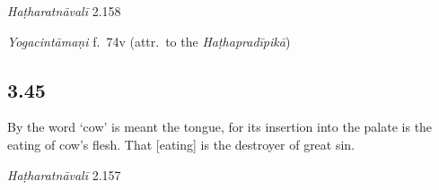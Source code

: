 \begin{ekdosis}

\begin{testimonia}[hp03_044]
\emph{Haṭharatnāvalī} 2.158
\begin{versinnote}
\end{versinnote}

\emph{Yogacintāmaṇi} f.~74v (attr.~to the \emph{Haṭhapradīpikā})
\begin{versinnote}
\end{versinnote}


\end{testimonia}


\subsection*{3.45}
\begin{translation}[hp03_045]
By the word `cow' is meant the tongue, for its insertion into the palate is the eating of cow's flesh. That [eating] is the destroyer of great sin.
\end{translation}


\begin{testimonia}[hp03_045]
\emph{Haṭharatnāvalī} 2.157
\begin{versinnote}
\end{versinnote}


\end{testimonia}
\end{ekdosis}

